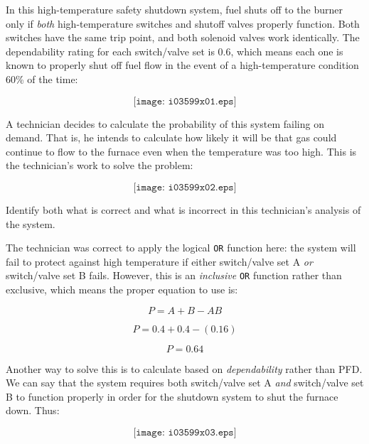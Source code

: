 

In this high-temperature safety shutdown system, fuel shuts off to the burner only if {\it both} high-temperature switches and shutoff valves properly function.  Both switches have the same trip point, and both solenoid valves work identically.  The dependability rating for each switch/valve set is 0.6, which means each one is known to properly shut off fuel flow in the event of a high-temperature condition 60\% of the time:

$$\texttt{[image: i03599x01.eps]}$$

A technician decides to calculate the probability of this system failing on demand.  That is, he intends to calculate how likely it will be that gas could continue to flow to the furnace even when the temperature was too high.  This is the technician's work to solve the problem:

$$\texttt{[image: i03599x02.eps]}$$

Identify both what is correct and what is incorrect in this technician's analysis of the system.

\vskip 10pt







The technician was correct to apply the logical {\tt OR} function here: the system will fail to protect against high temperature if either switch/valve set A {\it or} switch/valve set B fails.  However, this is an {\it inclusive} {\tt OR} function rather than exclusive, which means the proper equation to use is:

$$P = A + B - AB$$

$$P = 0.4 + 0.4 - (0.16)$$

$$P = 0.64$$

\vskip 10pt

Another way to solve this is to calculate based on {\it dependability} rather than PFD.  We can say that the system requires both switch/valve set A {\it and} switch/valve set B to function properly in order for the shutdown system to shut the furnace down.  Thus:

$$\texttt{[image: i03599x03.eps]}$$












